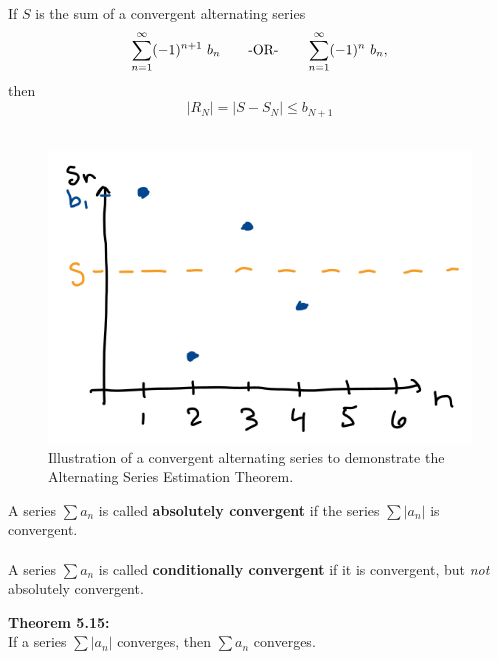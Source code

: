 \df{\textcolor{sblack}{Alternating Series Estimation/Remainder Theorem:}}~\\
If \(S\)  is the sum of a convergent alternating series
\[
\sum_{n=1}^\infty (-1)^{n+1}\ b_n  \qquad \text{-OR-} \qquad \sum_{n=1}^\infty (-1)^{n}\ b_n ,
\]
 then 
\[
|R_N| = |S - S_N| \leq b_{N+1}
\]
~\\
\begin{figure}[!h]
\centering
\includegraphics[width=.75\columnwidth]{Ch8s4-ASET.png}
\caption{Illustration of a convergent alternating series to demonstrate the Alternating Series Estimation Theorem.}
\end{figure}

\vspace*{.1in}

\df{\textcolor{sblack}{Absolute \& Conditional Convergence:}}
A series \(\sum a_n\) is called \textbf{absolutely convergent} if the series \(\sum |a_n|\) is convergent.\\~\\

A series \(\sum a_n\) is called \textbf{conditionally convergent} if it is convergent, but \textit{not} absolutely convergent.


\textbf{Theorem 5.15:}\\
If a series \(\sum |a_n|\) converges, then \(\sum a_n\) converges.





\pagebreak


